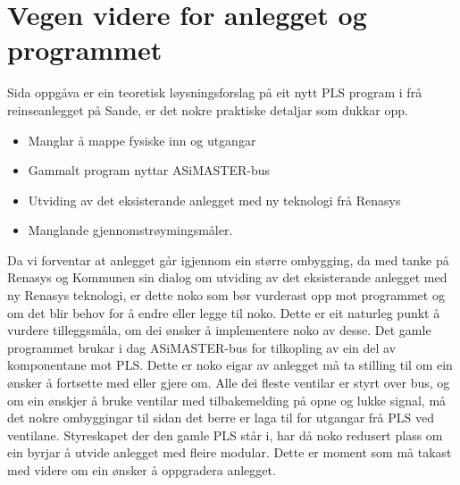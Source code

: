 \section{Vegen videre for anlegget og programmet}
\thispagestyle{fancy}

Sida oppgåva er ein teoretisk løysningsforslag på eit nytt PLS program i frå reinseanlegget på Sande, er det nokre praktiske detaljar som dukkar opp.

\begin{itemize}
    \item Manglar å mappe fysiske inn og utgangar
    \item Gammalt program nyttar ASiMASTER-bus  
    \item Utviding av det eksisterande anlegget med ny teknologi frå Renasys
    \item Manglande gjennomstrøymingsmåler.
\end{itemize}

Da vi forventar at anlegget går igjennom ein større ombygging,  da med tanke på Renasys og Kommunen sin dialog om utviding av det eksisterande anlegget med ny Renasys teknologi, er dette noko som bør vurderast opp mot programmet og om det blir behov for å endre eller legge til noko. 
Dette er eit naturleg punkt å vurdere tilleggsmåla, om dei ønsker å implementere noko av desse.
Det gamle programmet brukar i dag ASiMASTER-bus for tilkopling av ein del av komponentane mot PLS. 
Dette er noko eigar av anlegget må ta stilling til om ein ønsker å fortsette med eller gjere om. Alle dei fleste ventilar er styrt over bus, og om ein ønskjer å bruke ventilar med tilbakemelding på opne og lukke signal, må det nokre ombyggingar til sidan det berre er laga til for utgangar frå PLS ved ventilane.
Styreskapet der den gamle PLS står i, har då noko redusert plass om ein byrjar å utvide anlegget med fleire modular. 
Dette er moment som må takast med videre om ein ønsker å oppgradera anlegget. 


